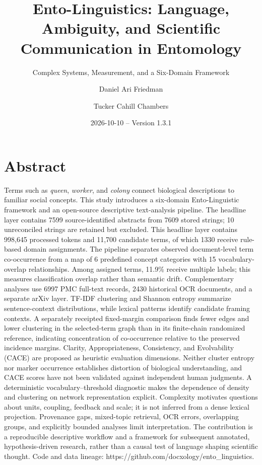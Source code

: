 \documentclass[
]{article}
\title{Ento-Linguistics: Language, Ambiguity, and Scientific
Communication in Entomology}
\subtitle{Complex Systems, Measurement, and a Six-Domain Framework}
\author{Daniel Ari Friedman \and Tucker Cahill Chambers}
\date{2026-10-10 -- Version 1.3.1}
\numberwithin{equation}{section}
\begin{document}
\maketitle

{
\setcounter{tocdepth}{2}
\tableofcontents
}
\section{Abstract}\label{sec:abstract}

Terms such as \emph{queen}, \emph{worker}, and \emph{colony} connect
biological descriptions to familiar social concepts. This study
introduces a six-domain Ento-Linguistic framework and an open-source
descriptive text-analysis pipeline. The headline layer contains 7599
source-identified abstracts from 7609 stored strings; 10 unreconciled
strings are retained but excluded. This headline layer contains 998,645
processed tokens and 11,700 candidate terms, of which 1330 receive
rule-based domain assignments. The pipeline separates observed
document-level term co-occurrence from a map of 6 predefined concept
categories with 15 vocabulary-overlap relationships. Among assigned
terms, 11.9\% receive multiple labels; this measures classification
overlap rather than semantic drift. Complementary analyses use 6997 PMC
full-text records, 2430 historical OCR documents, and a separate arXiv
layer. TF-IDF clustering and Shannon entropy summarize sentence-context
distributions, while lexical patterns identify candidate framing
contexts. A separately receipted fixed-margin comparison finds fewer
edges and lower clustering in the selected-term graph than in its
finite-chain randomized reference, indicating concentration of
co-occurrence relative to the preserved incidence margins. Clarity,
Appropriateness, Consistency, and Evolvability (CACE) are proposed as
heuristic evaluation dimensions. Neither cluster entropy nor marker
occurrence establishes distortion of biological understanding, and CACE
scores have not been validated against independent human judgments. A
deterministic vocabulary--threshold diagnostic makes the dependence of
density and clustering on network representation explicit. Complexity
motivates questions about units, coupling, feedback and scale; it is not
inferred from a dense lexical projection. Provenance gaps, mixed-topic
retrieval, OCR errors, overlapping groups, and explicitly bounded
analyses limit interpretation. The contribution is a reproducible
descriptive workflow and a framework for subsequent annotated,
hypothesis-driven research, rather than a causal test of language
shaping scientific thought. Code and data lineage:
https://github.com/docxology/ento\_linguistics.
\end{document}
